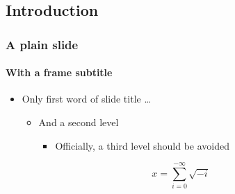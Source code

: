 \documentclass[aspectratio=169]{tuos-presentation}
\begin{document}
\subsection{Introduction}

\begin{frame}[plain]
  \frametitle{A plain slide}
  \framesubtitle{With a frame subtitle}
  \begin{itemize}
  \item Only first word of slide title \ldots
    \begin{itemize}
    \item  And a second level 
      \begin{itemize}
      \item  Officially, a third level should be avoided
      \end{itemize}
    \end{itemize}
  \end{itemize}
  \[ x = \sum_{i=0}^{-\infty}\sqrt{-i}\]
\end{frame}




\ThanksFrame

\CopyrightFrame
\end{document}
